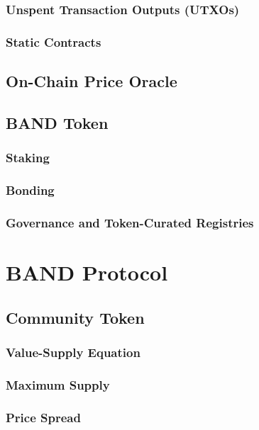 \documentclass[letterpaper,11pt]{article}
\begin{document}
\subsubsection{Unspent Transaction Outputs (UTXOs)}

\subsubsection{Static Contracts}

\subsection{On-Chain Price Oracle}

\subsection{BAND Token}

\subsubsection{Staking}

\subsubsection{Bonding}

\subsubsection{Governance and Token-Curated Registries}

\section{BAND Protocol}

\subsection{Community Token}

\subsubsection{Value-Supply Equation}

\subsubsection{Maximum Supply}

\subsubsection{Price Spread}
\end{document}
